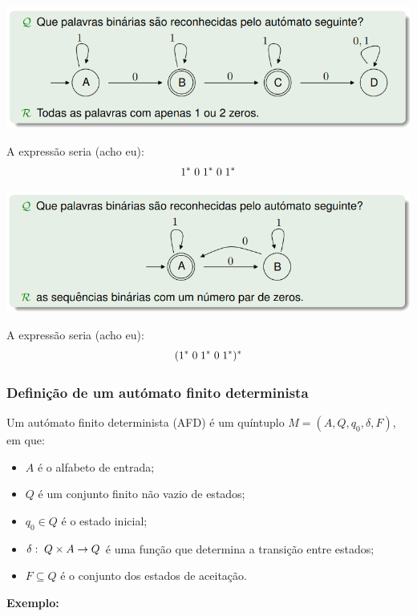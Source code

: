 \documentclass{article}
\begin{document}
\begin{flushleft}
    \begin{center}
      \includegraphics[scale=0.4]{31}
  \end{center}
  A expressão seria (acho eu):
    \[ 1^* \hspace{1mm} 0 \hspace{1mm} 1^* \hspace{1mm} 0 \hspace{1mm} 1^*\]

  \pagebreak

  \begin{center}
    \includegraphics[scale=0.4]{32}
  \end{center}

A expressão seria (acho eu):
    \[ (1^* \hspace{1mm} 0 \hspace{1mm} 1^* \hspace{1mm} 0 \hspace{1mm} 1^*)^*\]
\end{flushleft}

\subsubsection{Definição de um autómato finito determinista}

\begin{flushleft}
  \item Um autómato finito determinista (AFD) é um quíntuplo $M = (A,Q,q_0, \delta, F)$, em que:
  \begin{itemize}
    \item $A$ é o alfabeto de entrada;
    \item $Q$ é um conjunto finito não vazio de estados;
    \item $q_0 \in Q$ é o estado inicial;
    \item $\delta : \hspace{1mm} Q \times A \rightarrow Q$ é uma função que determina a transição entre estados;
    \item $F \subseteq Q$ é o conjunto dos estados de aceitação.
  \end{itemize}
\end{flushleft}
\vspace{4mm}
\textbf{Exemplo:}\hfill
\end{document}
